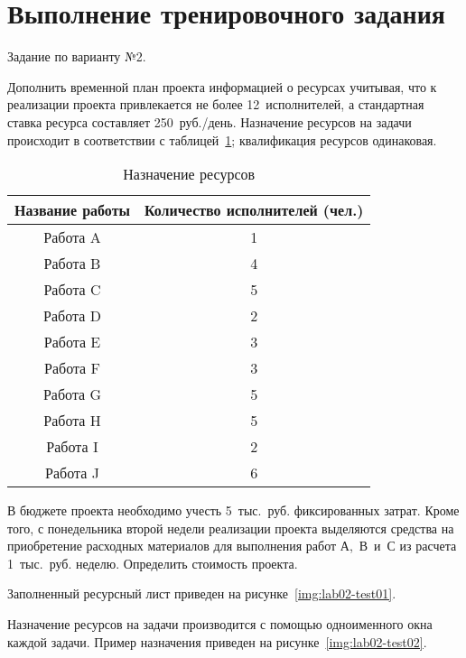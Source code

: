 \section{Выполнение тренировочного задания}

Задание по варианту №2.

Дополнить временной план проекта информацией о ресурсах учитывая, что к
реализации проекта привлекается не более 12~исполнителей, а стандартная ставка
ресурса составляет 250~руб./день. Назначение ресурсов на задачи происходит в
соответствии с таблицей~\ref{tab:01}; квалификация ресурсов одинаковая.

{
\fontsize{12pt}{12pt}\selectfont
\captionsetup{format=hang,justification=raggedleft,
              singlelinecheck=off,width=17cm}
\begin{longtable}[Hc]{|c|c|}
\caption{\label{tab:01}Назначение ресурсов}\\
    \hline
    Название работы & Количество исполнителей (чел.)\\
    \hline
    Работа A & 1\\
    \hline
    Работа B & 4\\
    \hline
    Работа C & 5\\
    \hline
    Работа D & 2\\
    \hline
    Работа E & 3\\
    \hline
    Работа F & 3\\
    \hline
    Работа G & 5\\
    \hline
    Работа H & 5\\
    \hline
    Работа I & 2\\
    \hline
    Работа J & 6\\
    \hline
\end{longtable}
}

В бюджете проекта необходимо учесть 5~тыс.~руб.  фиксированных затрат. Кроме
того, с понедельника второй недели реализации проекта выделяются средства на
приобретение расходных материалов для выполнения работ А,~В~и~С из расчета
1~тыс.~руб. неделю.  Определить стоимость проекта.

Заполненный ресурсный лист приведен на рисунке~\ref{img:lab02-test01}.


Назначение ресурсов на задачи производится с помощью одноименного окна каждой
задачи. Пример назначения приведен на рисунке~\ref{img:lab02-test02}.


